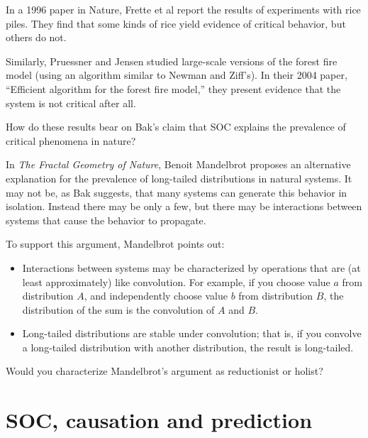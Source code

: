 \documentclass[10pt]{book}
\begin{document}
\begin{ex}

In a 1996 paper in Nature, Frette et al report the results of
experiments with rice piles.  They find that some kinds of rice
yield evidence of critical behavior, but others do not.

Similarly, Pruessner and Jensen studied large-scale versions of the
forest fire model (using an algorithm similar to Newman and Ziff's).
In their 2004 paper, ``Efficient algorithm for the forest fire model,''
they present evidence that the system is not critical after all.

How do these results bear on Bak's claim that SOC explains
the prevalence of critical phenomena in nature?

\end{ex}


\begin{ex}

In {\em The Fractal Geometry of Nature}, Benoit Mandelbrot proposes an
alternative explanation for the prevalence of long-tailed
distributions in natural systems.  It may not be, as Bak suggests,
that many systems can generate this behavior in isolation.  Instead
there may be only a few, but there may be interactions between systems
that cause the behavior to propagate.

To support this argument, Mandelbrot points out:

\begin{itemize}

\item Interactions between systems may be characterized by operations
  that are (at least approximately) like convolution.  For example,
  if you choose value $a$ from distribution $A$, and independently
  choose value $b$ from distribution $B$, the distribution of the
  sum is the convolution of $A$ and $B$.

\item Long-tailed distributions are stable under convolution; that is,
  if you convolve a long-tailed distribution with another
  distribution, the result is long-tailed.

\end{itemize}

Would you characterize Mandelbrot's argument as reductionist
or holist?

\end{ex}


\section{SOC, causation and prediction}
\end{document}
